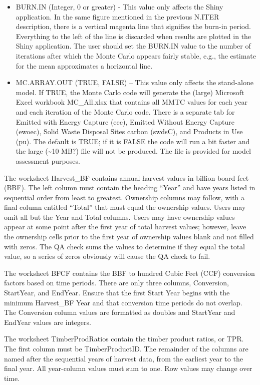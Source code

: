 \documentclass[
]{book}
\begin{document}
\begin{itemize}
\item
  BURN.IN (Integer, 0 or greater) - This value only affects the Shiny application. In the same figure mentioned in the previous N.ITER description, there is a vertical magenta line that signifies the burn-in period. Everything to the left of the line is discarded when results are plotted in the Shiny application. The user should set the BURN.IN value to the number of iterations after which the Monte Carlo appears fairly stable, e.g., the estimate for the mean approximates a horizontal line.
\item
  MC.ARRAY.OUT (TRUE, FALSE) -- This value only affects the stand-alone model. If TRUE, the Monte Carlo code will generate the (large) Microsoft Excel workbook MC\_All.xlsx that contains all MMTC values for each year and each iteration of the Monte Carlo code. There is a separate tab for Emitted with Energy Capture (eec), Emitted Without Energy Capture (ewoec), Solid Waste Disposal Sites carbon (swdsC), and Products in Use (pu). The default is TRUE; if it is FALSE the code will run a bit faster and the large (\textasciitilde10 MB?) file will not be produced. The file is provided for model assessment purposes.
\end{itemize}

The worksheet Harvest\_BF contains annual harvest values in billion board feet (BBF). The left column must contain the heading ``Year'' and have years listed in sequential order from least to greatest. Ownership columns may follow, with a final column entitled ``Total'' that must equal the ownership values. Users may omit all but the Year and Total columns. Users may have ownership values appear at some point after the first year of total harvest values; however, leave the ownership cells prior to the first year of ownership values blank and not filled with zeros. The QA check sums the values to determine if they equal the total value, so a series of zeros obviously will cause the QA check to fail.

The worksheet BFCF contains the BBF to hundred Cubic Feet (CCF) conversion factors based on time periods. There are only three columns, Conversion, StartYear, and EndYear. Ensure that the first Start Year begins with the minimum Harvest\_BF Year and that conversion time periods do not overlap. The Conversion column values are formatted as doubles and StartYear and EndYear values are integers.

The worksheet TimberProdRatios contain the timber product ratios, or TPR. The first column must be TimberProductID. The remainder of the columns are named after the sequential years of harvest data, from the earliest year to the final year. All year-column values must sum to one. Row values may change over time.
\end{document}
